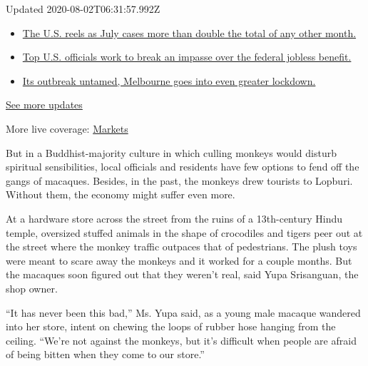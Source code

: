Updated 2020-08-02T06:31:57.992Z

\begin{itemize}
\tightlist
\item
  \href{https://www.nytimes.com/2020/08/01/world/coronavirus-covid-19.html?action=click\&pgtype=Article\&state=default\&region=MAIN_CONTENT_1\&context=storylines_live_updates\#link-34047410}{The
  U.S. reels as July cases more than double the total of any other
  month.}
\item
  \href{https://www.nytimes.com/2020/08/01/world/coronavirus-covid-19.html?action=click\&pgtype=Article\&state=default\&region=MAIN_CONTENT_1\&context=storylines_live_updates\#link-780ec966}{Top
  U.S. officials work to break an impasse over the federal jobless
  benefit.}
\item
  \href{https://www.nytimes.com/2020/08/01/world/coronavirus-covid-19.html?action=click\&pgtype=Article\&state=default\&region=MAIN_CONTENT_1\&context=storylines_live_updates\#link-2bc8948}{Its
  outbreak untamed, Melbourne goes into even greater lockdown.}
\end{itemize}

\href{https://www.nytimes.com/2020/08/01/world/coronavirus-covid-19.html?action=click\&pgtype=Article\&state=default\&region=MAIN_CONTENT_1\&context=storylines_live_updates}{See
more updates}

More live coverage:
\href{https://www.nytimes.com/live/2020/07/31/business/stock-market-today-coronavirus?action=click\&pgtype=Article\&state=default\&region=MAIN_CONTENT_1\&context=storylines_live_updates}{Markets}

But in a Buddhist-majority culture in which culling monkeys would
disturb spiritual sensibilities, local officials and residents have few
options to fend off the gangs of macaques. Besides, in the past, the
monkeys drew tourists to Lopburi. Without them, the economy might suffer
even more.

At a hardware store across the street from the ruins of a 13th-century
Hindu temple, oversized stuffed animals in the shape of crocodiles and
tigers peer out at the street where the monkey traffic outpaces that of
pedestrians. The plush toys were meant to scare away the monkeys and it
worked for a couple months. But the macaques soon figured out that they
weren't real, said Yupa Srisanguan, the shop owner.

``It has never been this bad,'' Ms. Yupa said, as a young male macaque
wandered into her store, intent on chewing the loops of rubber hose
hanging from the ceiling. ``We're not against the monkeys, but it's
difficult when people are afraid of being bitten when they come to our
store.''

